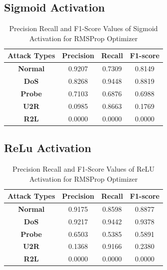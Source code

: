 \documentclass[12pt, a4paper]{report}
\begin{document}
\begin{appendices}
   \subsection{Sigmoid Activation}
   \begin{table}[h]
	\centering
	\captionsetup{justification=centering,margin=2cm}
	\begin{tabular}{|c|c|c|c|}
	\hline
	\textbf{Attack Types} & \textbf{Precision} & \textbf{Recall} & \textbf{F1-score} \\ \hline
	\textbf{Normal}       & 0.9207             & 0.7309          & 0.8149            \\ \hline
	\textbf{DoS}          & 0.8268             & 0.9448          & 0.8819            \\ \hline
	\textbf{Probe}        & 0.7103             & 0.6876          & 0.6988            \\ \hline
	\textbf{U2R}          & 0.0985             & 0.8663          & 0.1769            \\ \hline
	\textbf{R2L}          & 0.0000             & 0.0000          & 0.0000            \\ \hline
	\end{tabular}
	\caption{Precision Recall and F1-Score Values of Sigmoid Activation for RMSProp Optimizer}
	\label{classification sigmoid rms tflearn}
	\end{table} 
	
	\subsection{ReLu Activation}
   	\begin{table}[h]
		\centering
		\captionsetup{justification=centering,margin=2cm}
		\begin{tabular}{|c|c|c|c|}
		\hline
		\textbf{Attack Types} & \textbf{Precision} & \textbf{Recall} & \textbf{F1-score} \\ \hline
		\textbf{Normal}       & 0.9175             & 0.8598          & 0.8877            \\ \hline
		\textbf{DoS}          & 0.9217             & 0.9442          & 0.9378            \\ \hline
		\textbf{Probe}        & 0.6503             & 0.5385          & 0.5891            \\ \hline
		\textbf{U2R}          & 0.1368             & 0.9166          & 0.2380            \\ \hline
		\textbf{R2L}          & 0.0000             & 0.0000          & 0.0000            \\ \hline
		\end{tabular}
		\caption{Precision Recall and F1-Score Values of ReLU Activation for RMSProp Optimizer}
		\label{classification relu rms tflearn}
		\end{table} 
	\clearpage

\end{appendices}
\end{document}
